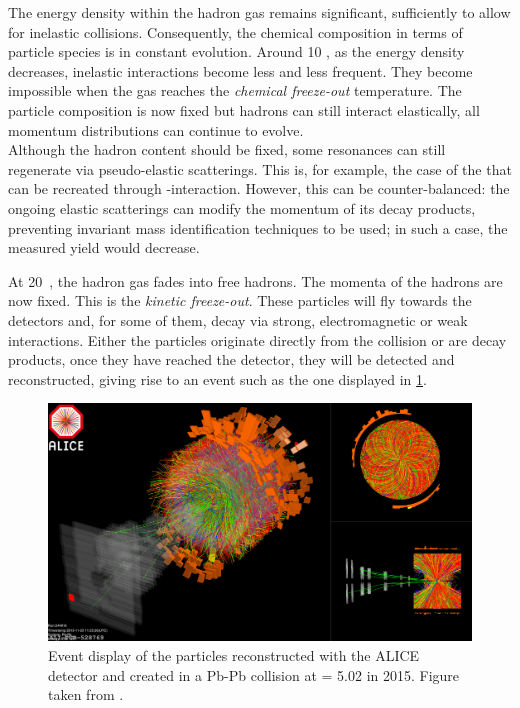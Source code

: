 The energy density within the hadron gas remains significant, sufficiently to allow for inelastic collisions. Consequently, the chemical composition in terms of particle species is in constant evolution. Around 10 \fmC, as the energy density decreases, inelastic interactions become less and less frequent. They become impossible when the gas reaches the \textit{chemical freeze-out} temperature. The particle composition is now fixed but hadrons can still interact elastically, all momentum distributions can continue to evolve.\\

Although the hadron content should be fixed, some resonances can still regenerate via pseudo-elastic scatterings. This is, for example, the case of the \rmKstarZero that can be recreated through \rmPiPM-\Kminplus interaction. However, this can be counter-balanced: the ongoing elastic scatterings can modify the momentum of its decay products, preventing invariant mass identification techniques to be used; in such a case, the measured yield would decrease.

At 20~\fmC, the hadron gas fades into free hadrons. The momenta of the hadrons are now fixed. This is the \textit{kinetic freeze-out}. These particles will fly towards the detectors and, for some of them, decay via strong, electromagnetic or weak interactions. Either the particles originate directly from the collision or are decay products, once they have reached the detector, they will be detected and reconstructed, giving rise to an event such as the one displayed in \fig\ref{fig:ALICEEventDisplay}.

\begin{figure}[h]
	\centering
	\includegraphics[width=\textwidth]{Figs/Chapter2/ALICE_EventDisplay.eps}
	\caption{Event display of the particles reconstructed with the ALICE detector and created in a Pb-Pb collision at \sqrtSnn = 5.02 \tev in 2015. Figure taken from \cite{alicecollaborationALICEExperimentJourney2022}.}
	\label{fig:ALICEEventDisplay}
\end{figure}

